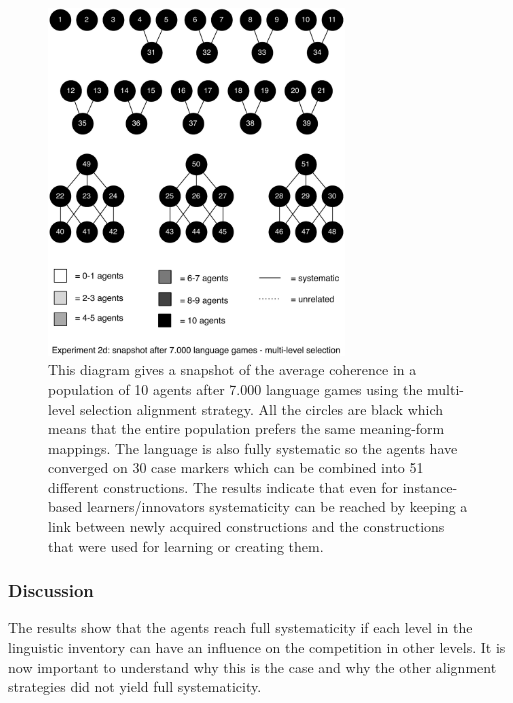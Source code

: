 \begin{figure}[p]
\centerline{\includegraphics[width=0.7\textwidth]{Chapter4/figs/multilevel-coherence-no-analogy-7000}}
  \caption[Experiment 2: snapshot after 7.000 games (multi-level selection)]{This diagram gives a snapshot of the average coherence in a population of 10 agents after 7.000 language games using the multi-level selection alignment strategy. All the circles are black which means that the entire population prefers the same meaning-form mappings. The language is also fully systematic so the agents have converged on 30 case markers which can be combined into 51 different constructions. The results indicate that even for instance-based learners/innovators systematicity can be reached by keeping a link between newly acquired constructions and the constructions that were used for learning or creating them.}
   \label{f:2d-coherence-7000}
\end{figure}


\subsubsection{Discussion}
 The results show that the agents reach full systematicity if each level in the linguistic inventory can have an influence on the competition in other levels. It is now important to understand why this is the case and why the other alignment strategies did not yield full systematicity.

